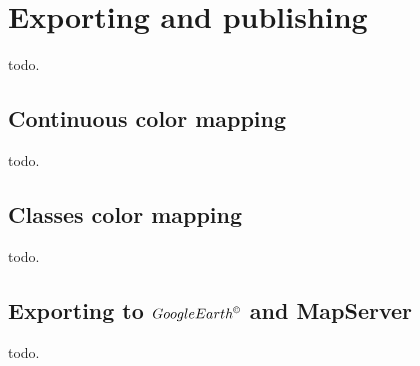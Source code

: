 \section{Exporting and publishing}\label{sec:export}

todo.

\subsection{Continuous color mapping}\label{ssec:colormapping}

todo.

\subsection{Classes color mapping}\label{ssec:classesmapping}

todo.

\subsection{Exporting to $Google Earth^{\copyright}$ and MapServer}\label{ssec:ge}

todo.
